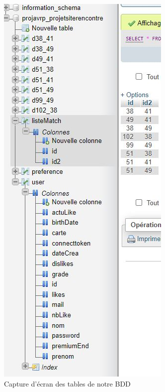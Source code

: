 \documentclass[12pt]{report}
\begin{document}
\begin{figure}[h!]
	\begin{center}
		\includegraphics[scale=0.9]{bdd.jpg}
	\end{center}
		\caption{Capture d'écran des tables de notre BDD}
\end{figure}
\clearpage
\end{document}
